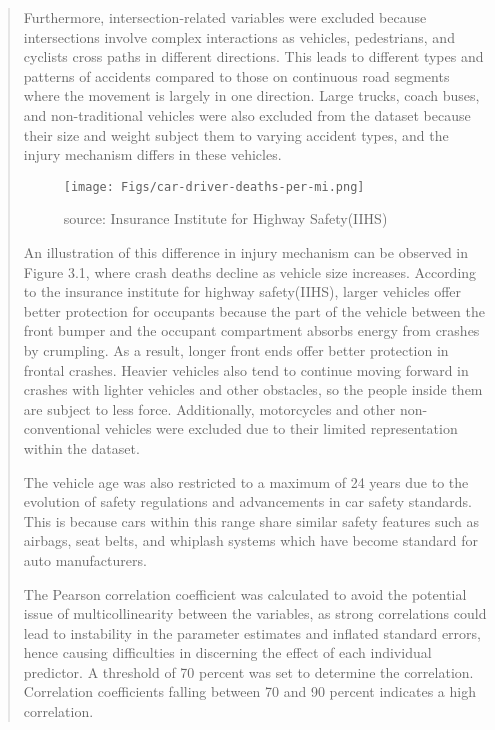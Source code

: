 \documentclass[12]{report}
\begin{document}
\begin{quote}
{Furthermore, intersection-related variables were excluded because intersections involve complex interactions as vehicles, pedestrians, and cyclists cross paths in different directions. This leads to different types and patterns of accidents compared to those on continuous road segments where the movement is largely in one direction. Large trucks, coach buses,  and non-traditional vehicles were also excluded from the dataset because their size and weight subject them to varying accident types, and the injury mechanism differs in these vehicles.

\begin{figure}[H]
    \centering
    \texttt{[image: Figs/car-driver-deaths-per-mi.png]}
    \caption{source: Insurance Institute for Highway Safety(IIHS)}
    \label{fig:enter-label}
\end{figure}

An illustration of this difference in injury mechanism can be observed in Figure 3.1, where crash deaths decline as vehicle size increases. According to the insurance institute for highway safety(IIHS), larger vehicles offer better protection for occupants because the part of the vehicle between the front bumper and the occupant compartment absorbs energy from crashes by crumpling. As a result, longer front ends offer better protection in frontal crashes. Heavier vehicles also tend to continue moving forward in crashes with lighter vehicles and other obstacles, so the people inside them are subject to less force. Additionally, motorcycles and other non-conventional vehicles were excluded due to their limited representation within the dataset.

The vehicle age was also restricted to a maximum of 24 years due to the evolution of safety regulations and advancements in car safety standards. This is because cars within this range share similar safety features such as airbags, seat belts, and whiplash systems which have become standard for auto manufacturers. 

\clearpage
The Pearson correlation coefficient was calculated to avoid the potential issue of multicollinearity between the variables, as strong correlations could lead to instability in the parameter estimates and inflated standard errors, hence causing difficulties in discerning the effect of each individual predictor. A threshold of 70 percent was set to determine the correlation. Correlation coefficients falling  between 70  and 90 percent
indicates a high correlation.

}
\end{quote}
\end{document}
